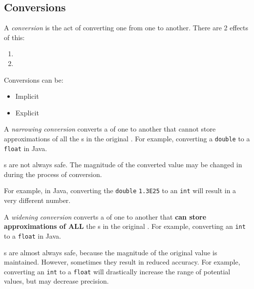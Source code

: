 \subsection{ Conversions}\label{subsec:Type_Conversions}
\begin{definition}\label{def:Type_Conversion}
  A \emph{ conversion} is the act of converting one  from one to another.
  There are 2 effects of this:
  \begin{enumerate}[noitemsep]
  \item {}
  \item {}
  \end{enumerate}

  Conversions can be:
  \begin{itemize}[noitemsep]
  \item Implicit
  \item Explicit
  \end{itemize}
\end{definition}

\begin{definition}\label{def:Narrowing_Conversion}
  A \emph{narrowing conversion} converts a  of one  to another that cannot store approximations of all the s in the original .
  For example, converting a \texttt{double} to a \texttt{float} in Java.

  \begin{remark}[Safety]\label{rmk:Narrowing_Conversion-Safety}
    s are not always safe.
    The magnitude of the converted value may be changed in during the process of conversion.

    For example, in Java, converting the \texttt{double} \texttt{1.3E25} to an \texttt{int} will result in a very different number.
  \end{remark}
\end{definition}

\begin{definition}\label{def:Widening_Conversion}
  A \emph{widening conversion} converts a  of one  to another that \textbf{can store approximations of ALL} the s in the original .
  For example, converting an \texttt{int} to a \texttt{float} in Java.

  \begin{remark}[Safety]\label{rmk:Widening_Conversion-Safety}
    s are almost always safe, because the magnitude of the original value is maintained.
    However, sometimes they result in reduced accuracy.
    For example, converting an \texttt{int} to a \texttt{float} will drastically increase the range of potential values, but may decrease precision.
  \end{remark}
\end{definition}

